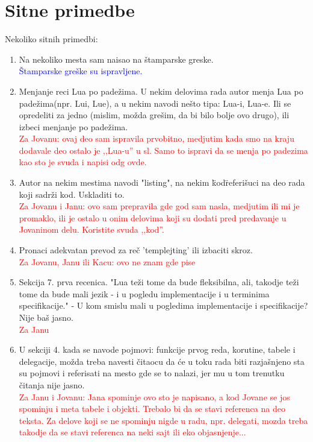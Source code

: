 \documentclass[a4paper]{report}
\newcommand{\odgovorAutora}[1]{\textcolor{blue}{#1}}
\newcommand{\note}[1]{\textcolor{red}{#1}}
\begin{document}
\section{Sitne primedbe}
Nekoliko sitnih primedbi:
\begin{enumerate}
  \item Na nekoliko mesta sam naisao na \v stamparske greske. \\
  \odgovorAutora{Štamparske greške su ispravljene.}
  \item Menjanje reci Lua po pade\v zima. U nekim delovima rada autor menja Lua po pade\v zima(npr. Lui, Lue), a u nekim navodi ne\v sto tipa: Lua-i, Lua-e. Ili se opredeliti za jedno (mislim, mo\v zda gre\v sim, da bi bilo bolje ovo drugo), ili izbeci menjanje po pade\v zima. \\
  \note{Za Jovanu: ovaj deo sam ispravila prvobitno, medjutim kada smo na kraju dodavale deo ostalo je ,,Lua-u'' u sl. Samo to ispravi da se menja po padezima kao sto je svuda i napisi odg ovde.}
  \item Autor na nekim mestima navodi "listing", na nekim \"kod\"  referi\v suci na deo rada koji sadr\v zi kod. Uskladiti to. \\
  \note{Za Jovanu i Janu: ovo sam prepravila gde god sam nasla, medjutim ili mi je promaklo, ili je ostalo u onim delovima koji su dodati pred predavanje u Jovaninom delu. Koristite svuda ,,kod''.}
  \item Pronaci adekvatan prevod za re\v c 'templejting'  ili izbaciti skroz. \\
  \note{Za Jovanu, Janu ili Kacu: ovo ne znam gde pise}
  \item Sekcija 7. prva recenica. "Lua te\v zi tome da bude fleksibilna, ali, takodje te\v zi tome da bude mali
jezik - i u pogledu implementacije i u terminima specifikacije." - U kom smislu mali u pogledima implementacije i specifikacije? Nije ba\v s jasno. \\
  \note{Za Janu}
  \item U sekciji 4. kada se navode pojmovi: funkcije prvog reda, korutine, tabele i delegacije, mo\v zda treba navesti \v citaocu da \' ce u toku rada biti razja\v snjeno sta su pojmovi i referisati na mesto gde se to nalazi, jer mu u tom trenutku \v citanja nije jasno. \\
  \note{Za Janu i Jovanu: Jana spominje ovo sto je napisano, a kod Jovane se jos spominju i meta tabele i objekti. Trebalo bi da se stavi referenca na deo teksta. Za delove koji se ne spominju nigde u radu, npr. delegati, mozda treba takodje da se stavi referenca na neki sajt ili eko objasnjenje...}

\end{enumerate}
\end{document}
